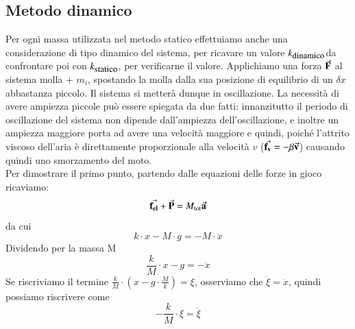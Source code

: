 \documentclass[italian, a4paper, 10pt, twocolumn]{../../style/lab_unige}
\newcommand{\ks}{$k_{\text{\small statico}}$\space}
\newcommand{\kd}{$k_{\text{\small dinamico}}$\space}
\newcommand{\MassI}[1]{$m_{#1}$}
\begin{document}
    \subsection{Metodo dinamico}
    \label{subsec:methods_dyn}
    Per ogni massa utilizzata nel metodo statico effettuiamo anche una considerazione di tipo dinamico del 
    sistema, per ricavare un valore \kd da confrontare poi con \ks, per verificarne il valore.
    Applichiamo una forza $\va{F}$ al sistema molla + \MassI{i}, spostando la molla dalla sua posizione di 
    equilibrio di un $\delta x$ abbastanza piccolo. Il sistema si metterà dunque in oscillazione. La necessità
    di avere ampiezza piccole può essere spiegata da due fatti: innanzitutto il periodo di oscillazione del 
    sistema non dipende dall'ampiezza dell'oscillazione, e inoltre un ampiezza maggiore porta ad avere una 
    velocità maggiore e quindi, poiché l'attrito viscoso dell'aria è direttamente proporzionale alla velocità 
    $v$ ($\va{f_v}=-\beta \va{v}$) causando quindi uno smorzamento del moto.\\
    Per dimostrare il primo punto, partendo dalle equazioni delle forze in gioco ricaviamo:
    \[
        \va{f_{el}} + \va{P} = M_{\text{tot}}\va{a}
    \]
    da cui 
    \[
        k\cdot x - M\cdot g = - M \cdot \ddot{x}
    \]
    Dividendo per la massa M
    \[
        \frac{k}{M}\cdot x - g = - \ddot{x}
    \]
    Se riscriviamo il termine $\frac{k}{M} \cdot (x - g\cdot\frac{M}{k}) = \xi$, osserviamo che 
    $\ddot{\xi} = \ddot{x}$, quindi possiamo riscrivere come
    \[
        - \frac{k}{M} \cdot \xi = \ddot{\xi}
    \]
\end{document}
